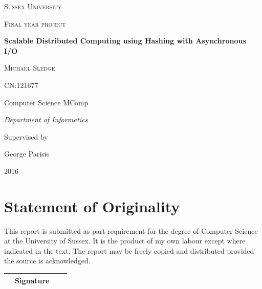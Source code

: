 \documentclass{article}
\begin{document}
\begin{titlepage}
	\centering
	{\scshape\LARGE Sussex University \par}
	\vspace{1cm}
	{\scshape\Large Final year project\par}
	\vspace{1.5cm}
	{\huge\bfseries Scalable Distributed Computing using Hashing with Asynchronous I/O\par}
	\vspace{2cm}
	{\Large\scshape Michael Sledge\par}
	{\Large CN:121677\par}
	\vspace{1cm}
	{\Large Computer Science MComp\par}
	{\Large\itshape Department of Informatics\par}
	\vspace{1cm}
	{Supervised by}\par
	{\large George Parisis}

	\vfill

	{\large 2016\par}
\end{titlepage}

\section*{Statement of Originality}
This report is submitted as part requirement for the degree of Computer Science at the University of Sussex. It is the product of my own labour except where indicated in the text. The report may be freely copied and distributed provided the source is acknowledged.
\begin{table}[b]
\centering
\bgroup
\def\arraystretch{2.5}
\begin{tabularx}{0.8\textwidth}{|l c l|X|}
\hline
& Signature & & \\\hline
\end{tabularx}
\egroup
\end{table}

\newpage
\end{document}
